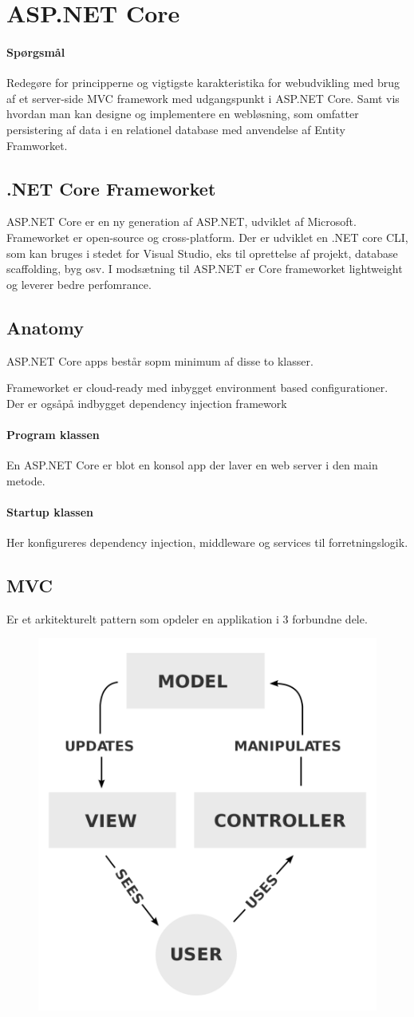 \section{ASP.NET Core}

\paragraph{Spørgsmål}
Redegøre for principperne og vigtigste karakteristika for webudvikling med brug af et server-side MVC framework med udgangspunkt i ASP.NET Core. Samt vis hvordan man kan designe og implementere en	webløsning, som omfatter persistering af data i en relationel database med anvendelse af Entity Framworket.

\subsection{.NET Core Frameworket}
ASP.NET Core er en ny generation af ASP.NET, udviklet af Microsoft. Frameworket er open-source og cross-platform.
Der er udviklet en .NET core CLI, som kan bruges i stedet for Visual Studio, eks til oprettelse af projekt, database scaffolding, byg osv.
I modsætning til ASP.NET er Core frameworket lightweight og leverer bedre perfomrance.\\

\subsection{Anatomy}
ASP.NET Core apps består sopm minimum af disse to klasser.

Frameworket er cloud-ready med inbygget environment based configurationer.
Der er ogsåpå indbygget dependency injection framework
\paragraph{Program klassen}
En ASP.NET Core er blot en konsol app der laver en web server i den main metode.\\

\paragraph{Startup klassen}
Her konfigureres dependency injection, middleware og services til forretningslogik.

\subsection{MVC}
Er et arkitekturelt pattern som opdeler en applikation i 3 forbundne dele.

\begin{figure}[H]
	\centering
	\includegraphics[width=0.5\linewidth]{figs/spm1/mvc}
\end{figure}

